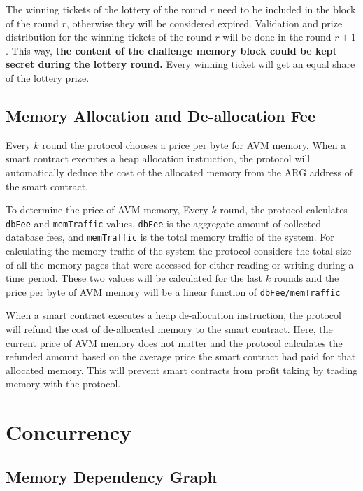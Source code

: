 \documentclass[a4paper]{report}
\begin{document}
    The winning tickets of the lottery of the round \(r\) need to be included in the block of the round \(r\),
    otherwise they will be considered expired. Validation and prize distribution for the winning tickets of the round
    \(r\) will be done in the round \(r + 1\). This way, \textbf{the content of the challenge memory block could be
    kept secret during the lottery round.} Every winning ticket will get an equal share of the lottery prize.

    \subsection{Memory Allocation and De-allocation Fee}\label{subsec:memory-allocation-and-de-allocation}

    Every \(k\) round the protocol chooses a price per byte for AVM memory. When a smart contract executes a heap
    allocation instruction, the protocol will automatically deduce the cost of the allocated memory from the ARG
    address of the smart contract.

    To determine the price of AVM memory, Every \(k\) round, the protocol calculates \texttt{dbFee} and
    \texttt{memTraffic} values. \texttt{dbFee} is the aggregate amount of collected database fees, and
    \texttt{memTraffic} is the total memory traffic of the system. For calculating the memory traffic of the system
    the protocol considers the total size of all the memory pages that were accessed for either reading or writing
    during a time period. These two values will be calculated for the last \(k\) rounds and the price per byte of
    AVM memory will be a linear function of \texttt{dbFee/memTraffic}

    When a smart contract executes a heap de-allocation instruction, the protocol will refund the cost of
    de-allocated memory to the smart contract. Here, the current price of AVM memory does not matter and the protocol
    calculates the refunded amount based on the average price the smart contract had paid for that allocated memory.
    This will prevent smart contracts from profit taking by trading memory with the protocol.


    \section{Concurrency}\label{sec:concurrency}

    \subsection{Memory Dependency Graph}\label{subsec:memory-dependency-graph}
\end{document}
